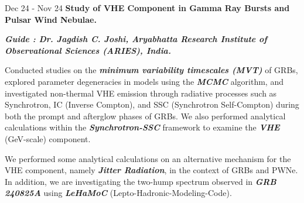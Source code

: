         \vspace{0.10 cm}
        \begin{twocolentry}{
            Dec 24 - Nov 24
        }
            \textbf{Study of VHE Component in Gamma Ray Bursts and Pulsar Wind Nebulae.} \end{twocolentry}

        \begin{onecolentry}
            \textbf{\textit{Guide : Dr. Jagdish C. Joshi, Aryabhatta Research Institute of Observational Sciences (ARIES), India.}}\\
            
            \vspace{0.10 cm}
            \begin{highlights}
                \item Conducted studies on the \textbf{\textit{minimum variability timescales (MVT)}} of GRBs, explored parameter degeneracies in models using the \textbf{\textit{MCMC}} algorithm, and investigated non-thermal VHE emission through radiative processes such as Synchrotron, IC (Inverse Compton), and SSC (Synchrotron Self-Compton) during both the prompt and afterglow phases of GRBs. We also performed analytical calculations within the \textbf{\textit{Synchrotron-SSC}} framework to examine the \textbf{\textit{VHE}} (GeV-scale) component.
                
                \item We performed some analytical calculations on an alternative mechanism for the VHE component, namely \textbf{\textit{Jitter Radiation}}, in the context of GRBs and PWNe. In addition, we are investigating the two-hump spectrum observed in \textbf{\textit{GRB 240825A}} using \textbf{\textit{LeHaMoC}} (Lepto-Hadronic-Modeling-Code).


                

\end{highlights}
\end{onecolentry}

